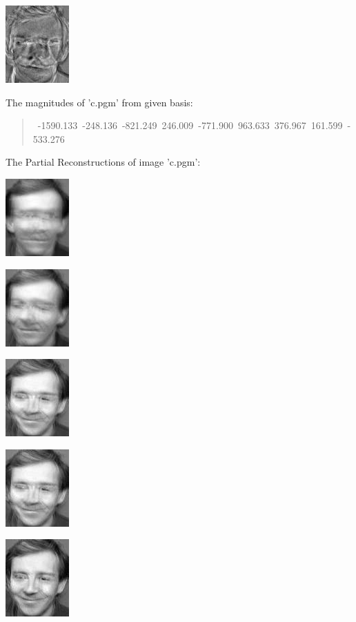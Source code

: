 \documentclass[a4paper]{article}
\begin{document}
\includegraphics[scale=0.500000]{PrincipalComponent9.jpg}

The magnitudes of 'c.pgm' from given basis:
%
\begin{quote}{\ttfamily \raggedright {}~-1590.133~-248.136~-821.249~246.009~-771.900~963.633~376.967~161.599~-533.276
}
\end{quote}

The Partial Reconstructions of image 'c.pgm':

\includegraphics[scale=0.500000]{PartialReconstruction0.jpg}

\includegraphics[scale=0.500000]{PartialReconstruction1.jpg}

\includegraphics[scale=0.500000]{PartialReconstruction2.jpg}

\includegraphics[scale=0.500000]{PartialReconstruction3.jpg}

\includegraphics[scale=0.500000]{PartialReconstruction4.jpg}
\end{document}
